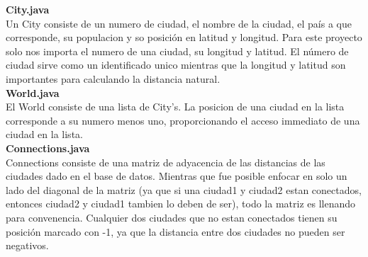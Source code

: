 \documentclass{article}
\begin{document}
    \textbf{City.java} \\
    Un City consiste de un numero de ciudad, el nombre de la ciudad, el país a que corresponde, su populacion
    y so posición en latitud y longitud. Para este proyecto solo nos importa el numero de una ciudad, su
    longitud y latitud. El número de ciudad sirve como un identificado unico mientras que la longitud y latitud
    son importantes para calculando la distancia natural. \\
    
    
    \textbf{World.java} \\
    El World consiste de una lista de City's. La posicion de una ciudad en la lista corresponde a su numero
    menos uno, proporcionando el acceso immediato de una ciudad en la lista.\\
    
    
    \textbf{Connections.java} \\
     Connections consiste de una matriz de adyacencia de las distancias de las ciudades dado en el
    base de datos. Mientras que fue posible enfocar en solo un lado del diagonal de la matriz (ya que
    si una ciudad1 y ciudad2 estan conectados, entonces ciudad2 y ciudad1 tambien lo deben de ser), todo la matriz es llenando para convenencia. Cualquier dos ciudades que no estan conectados tienen su posición
    marcado con -1, ya que la distancia entre dos ciudades no pueden ser negativos.\\
    
    
\end{document}
